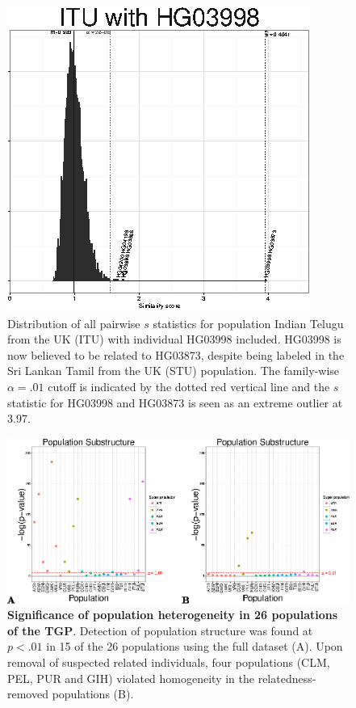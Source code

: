 \begin{figure}
\includegraphics[width=1\columnwidth]{./figures/figure2_bw.eps}\caption{Distribution of all pairwise $s$ statistics for population Indian
Telugu from the UK (ITU) with individual HG03998 included. HG03998
is now believed to be related to HG03873, despite being labeled in
the Sri Lankan Tamil from the UK (STU) population. The family-wise
$\alpha=.01$ cutoff is indicated by the dotted red vertical line
and the $s$ statistic for HG03998 and HG03873 is seen as an extreme
outlier at 3.97.}
\label{fig: ITU with HG03998}
\end{figure}

\begin{figure}
\includegraphics[width=1\columnwidth]{./figures/figure3.eps}
\caption{\textbf{Significance of population heterogeneity in 26 populations
of the TGP}. Detection of population structure was found at $p<.01$
in 15 of the 26 populations using the full dataset (A). Upon removal
of suspected related individuals, four populations (CLM, PEL, PUR
and GIH) violated homogeneity in the relatedness-removed populations
(B).}
\label{fig: Structure pvals}
\end{figure}


